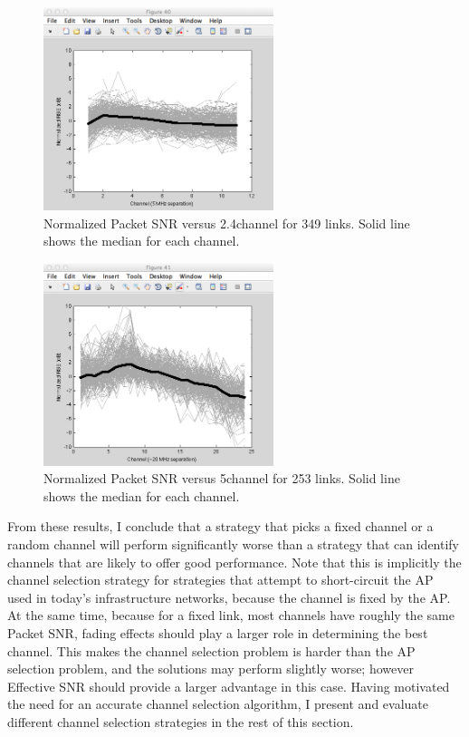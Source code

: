 \begin{figure}[htp]
	\centering
	\includegraphics[width=0.6\textwidth]{figures/esnr/rssi_vs_freq_24.png}
	\caption{\label{fig:rssi_vs_freq_24}Normalized Packet SNR versus 2.4\GHz channel for 349 links. Solid line shows the median for each channel.}
\end{figure}
\begin{figure}[htp]
	\centering
	\includegraphics[width=0.6\textwidth]{figures/esnr/rssi_vs_freq_5.png}
	\caption{\label{fig:rssi_vs_freq_5}Normalized Packet SNR versus 5\GHz channel for 253 links. Solid line shows the median for each channel.}
\end{figure}

From these results, I conclude that a strategy that picks a fixed channel or a random channel will perform significantly worse than a strategy that can identify channels that are likely to offer good performance. Note that this is implicitly the channel selection strategy for strategies that attempt to short-circuit the AP~\cite{Afanasyev_RTSid} used in today's infrastructure networks, because the channel is fixed by the AP. At the same time, because for a fixed link, most channels have roughly the same Packet SNR, fading effects should play a larger role in determining the best channel. This makes the channel selection problem is harder than the AP selection problem, and the solutions may perform slightly worse; however Effective SNR should provide a larger advantage in this case. Having motivated the need for an accurate channel selection algorithm, I present and evaluate different channel selection strategies in the rest of this section.

